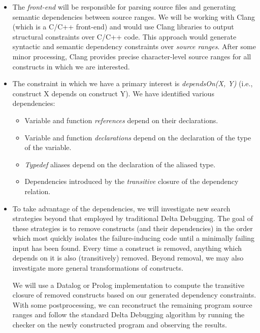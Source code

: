 \documentclass[11pt]{article}
\begin{document}
\begin{itemize}
\item The \emph{front-end} will be responsible for parsing source files and
  generating semantic dependencies between source ranges. We will be working
  with Clang \citep{clang} (which is a C/C++ front-end) and would use Clang libraries to
  output structural constraints over C/C++ code.  This approach would generate
  syntactic and semantic dependency constraints over \emph{source ranges}.  After
  some minor processing, Clang provides precise character-level source ranges for
  all constructs in which we are interested.

\item The constraint in which we have a primary interest is \emph{dependsOn(X,
  Y)} (i.e., construct X depends on construct Y).  We have identified various
  dependencies:

\begin{itemize}
\item{Variable and function \emph{references} depend on their declarations.}
\item{Variable and function \emph{declarations} depend on the declaration of the
  type of the variable.}
\item{\emph{Typedef} aliases depend on the declaration of the aliased type.}
\item{Dependencies introduced by the \emph{transitive} closure of the dependency
  relation.
}
\end{itemize}

\item To take advantage of the dependencies, we will investigate new search
  strategies beyond that employed by traditional Delta Debugging.  The goal of
  these strategies is to remove constructs (and their dependencies) in the order
  which most quickly isolates the failure-inducing code until a minimally
  failing input has been found.  Every time a construct is removed, anything
  which depends on it is also (transitively) removed.  Beyond removal, we may
  also investigate more general transformations of constructs.

  We will use a Datalog or Prolog implementation to compute the transitive
  closure of removed constructs based on our generated dependency constraints.
  With some postprocessing, we can reconstruct the remaining program source
  ranges and follow the standard Delta Debugging algorithm by running the
  checker on the newly constructed program and observing the results.

\end{itemize}
\end{document}
